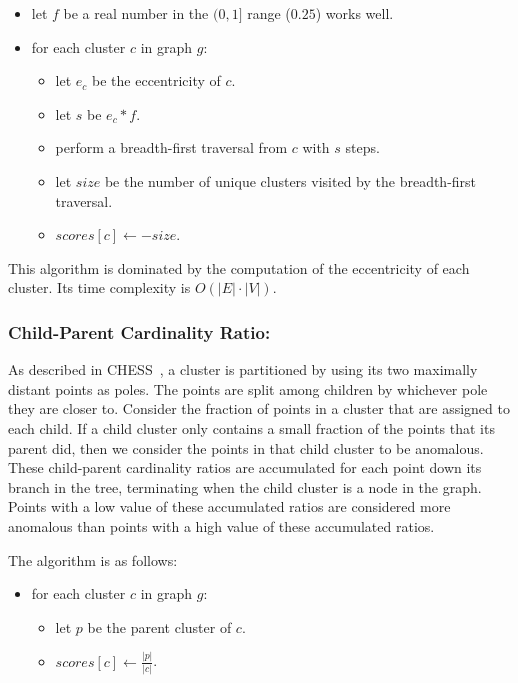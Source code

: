 \begin{itemize}
    \item let $f$ be a real number in the $(0, 1]$ range ($0.25$) works well.
    \item for each cluster $c$ in graph $g$:
    \begin{itemize}
        \item let $e_c$ be the eccentricity of $c$.
        \item let $s$ be $e_c * f$.
        \item perform a breadth-first traversal from $c$ with $s$ steps.
        \item let $size$ be the number of unique clusters visited by the breadth-first traversal.
        \item $scores[c] \leftarrow -size$.
    \end{itemize}
\end{itemize}

This algorithm is dominated by the computation of the eccentricity of each cluster.
Its time complexity is $O(|E| \cdot |V|)$.

\subsubsection{Child-Parent Cardinality Ratio:}
As described in CHESS~\cite{ishaq2019clustered}, a cluster is partitioned by using its two maximally distant points as poles.
The points are split among children by whichever pole they are closer to.
Consider the fraction of points in a cluster that are assigned to each child.
If a child cluster only contains a small fraction of the points that its parent did, then we consider the points in that child cluster to be anomalous.
These child-parent cardinality ratios are accumulated for each point down its branch in the tree, terminating when the child cluster is a node in the graph.
Points with a low value of these accumulated ratios are considered more anomalous than points with a high value of these accumulated ratios.

The algorithm is as follows:

\begin{itemize}
    \item for each cluster $c$ in graph $g$:
    \begin{itemize}
        \item let $p$ be the parent cluster of $c$.
        \item $scores[c] \leftarrow \frac{|p|}{|c|}$.
    \end{itemize}
\end{itemize}

